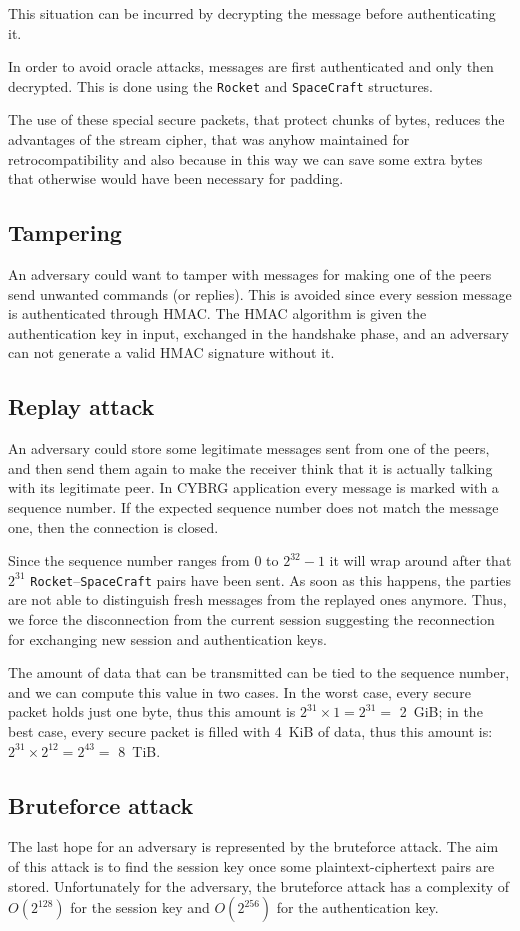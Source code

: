 \documentclass[a4paper,12pt]{article}
\newcommand{\projectname}{CYBRG}
\begin{document}
This situation can be incurred by decrypting the message before authenticating it.

In order to avoid oracle attacks, messages are first authenticated and only then decrypted.
This is done using the \texttt{Rocket} and \texttt{SpaceCraft} structures.

The use of these special secure packets, that protect chunks of bytes, reduces the advantages of the stream cipher, that was anyhow maintained for retrocompatibility and also because in this way we can save some extra bytes that otherwise would have been necessary for padding.

\subsection{Tampering}
An adversary could want to tamper with messages for making one of the peers send unwanted commands (or replies).
This is avoided since every session message is authenticated through HMAC.
The HMAC algorithm is given the authentication key in input, exchanged in the handshake phase, and an adversary can not generate a valid HMAC signature without it.

\subsection{Replay attack}
An adversary could store some legitimate messages sent from one of the peers, and then send them again to make the receiver think that it is actually talking with its legitimate peer.
In \projectname{} application every message is marked with a sequence number.
If the expected sequence number does not match the message one, then the connection is closed.

Since the sequence number ranges from $0$ to $2^{32} - 1$ it will wrap around after that $2^{31}$ \texttt{Rocket}--\texttt{SpaceCraft} pairs have been sent.
As soon as this happens, the parties are not able to distinguish fresh messages from the replayed ones anymore.
Thus, we force the disconnection from the current session suggesting the reconnection for exchanging new session and authentication keys.

The amount of data that can be transmitted can be tied to the sequence number, and we can compute this value in two cases.
In the worst case, every secure packet holds just one byte, thus this amount is $ 2^{31} \times 1 = 2^{31} = $ 2~GiB;
in the best case, every secure packet is filled with 4~KiB of data, thus this amount is: $ 2^{31} \times 2^{12} = 2^{43} = $ 8~TiB.

\subsection{Bruteforce attack}
The last hope for an adversary is represented by the bruteforce attack.
The aim of this attack is to find the session key once some plaintext-ciphertext pairs are stored.
Unfortunately for the adversary, the bruteforce attack has a complexity of $O(2^{128})$ for the session key and $O(2^{256})$ for the authentication key.
\end{document}
